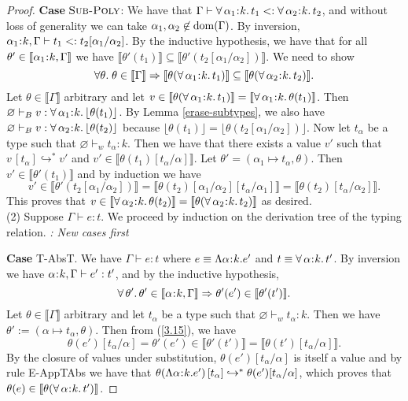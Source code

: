 \documentclass[11pt]{article}
\newcommand{\al}{\alpha}
\newcommand{\bind}{\hspace{0.05em}{:}\hspace{0.05em}} %
\newcommand{\lb}{\llbracket}         %
\newcommand{\rb}{\rrbracket}         %
\newcommand{\many}{\hookrightarrow^*}
\newcommand{\polytype}[3]{\forall\, #1\bind #2.\, #3}
\begin{document}
\begin{proof}
{\bf Case} $\textsc{Sub-Poly}$: We have that
$\Gamma \vdash \polytype{\al_1}{k}{t_1} <: \polytype{\al_2}{k}{t_2}$, and without loss of generality we can take $\al_1, \al_2 \not\in {\rm dom}(\Gamma)$. By inversion, $\al_1\bind k,\Gamma \vdash t_1 <: t_2 [\al_1/\al_2]$.
By the inductive hypothesis, we have that for all $\theta' \in \lb \al_1\bind k, \Gamma\rb$ we have 
$\lb \theta'(t_1) \rb \subseteq \lb \theta'( t_2[\al_1/\al_2] )\rb$.
We need to show \[\forall\theta.\; \theta \in \lb\Gamma\rb \Rightarrow \lb \theta(\polytype{\al_1}{k}{t_1})\rb \subseteq \lb \theta(\polytype{\al_2}{k}{t_2})\rb.\] 
Let $\theta \in \lb\Gamma\rb$ arbitrary and let $v \in \lb\theta( \polytype{\al_1}{k}{t_1})\rb = \lb\polytype{\al_1}{k}{\theta(t_1)}\rb$. Then $\varnothing \vdash_B v : \polytype{\al_1}{k}{\lfloor \theta(t_1) \rfloor}$. By Lemma \ref{erase-subtypes}, we also have $\varnothing \vdash_B v : \polytype{\al_2}{k}{\lfloor \theta(t_2) \rfloor}$ because $\lfloor \theta(t_1) \rfloor = \lfloor \theta(t_2[\al_1/\al_2]) \rfloor$. Now let $t_\al$ be a type such that $\varnothing \vdash_w t_\al : k$. Then we have that there exists a value $v'$ such that 
$v\, [t_\al] \many v'$ and $v' \in \lb \theta(t_1)[t_\al/\al]\rb.$
Let $\theta' = (\al_1 \mapsto t_\al, \theta)$. Then $v' \in \lb\theta'(t_1)\rb$ and by induction we have
\[
v' \in \lb\theta'(t_2[\al_1/\al_2])\rb = \lb\theta(t_2)[\al_1/\al_2][t_\al/\al_1]\rb = \lb \theta(t_2)[t_\al/\al_2]\rb.
\]
This proves that $v \in \lb\polytype{\al_2}{k}{\theta(t_2)}\rb = \lb\theta(\polytype{\al_2}{k}{t_2})\rb$ as desired.\\

(2) Suppose $\Gamma \vdash e : t$. %
We proceed by induction on the derivation tree of the typing relation. {\em: New cases first}

{\bf Case} {\sc T-AbsT}. We have $\Gamma \vdash e : t$ where $e \equiv \Lambda \al\bind k. e'$ and $t \equiv \polytype{\al}{k}{t'}$. By inversion we have $\al\bind k, \Gamma \vdash e' : t'$, and by the inductive hypothesis,
\begin{equation}\label{3.15}
\forall\, \theta'.\, \theta' \in \lb\al\bind k, \Gamma\rb \Rightarrow
\theta'(e') \in \lb\theta'(t')\rb.
\end{equation}
Let $\theta \in \lb\Gamma\rb$ arbitrary and let $t_\al$ be a type such that $\varnothing \vdash_w t_\al : k$. Then we have $\theta' := (\al \mapsto t_\al, \theta).$ Then from (\ref{3.15}), we have \[
\theta(e')[t_\al/\al] = \theta'(e') \in \lb \theta'(t')\rb = \lb\theta(t')[t_\al/\al]\rb.
\]
By the closure of values under substitution, $\theta(e')[t_\al/\al]$ is itself a value and by rule {\sc E-AppTAbs} we have that $\theta(\Lambda \al\bind k. e')\, [t_\al] \many \theta(e')[t_\al/\al]$, which proves that $\theta(e) \in \lb\theta(\polytype{\al}{k}{t'})\rb$.


\end{proof}
\end{document}
